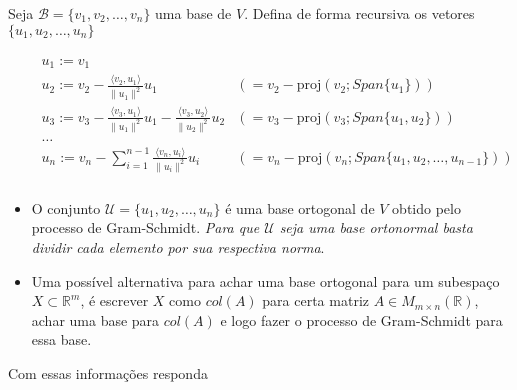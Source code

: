 \documentclass[10pt]{article}
\theoremstyle{plain}
\theoremstyle{obs}
\numberwithin{equation}{section}
\begin{document}
 Seja $\mathcal{B}=\{v_1, v_2, \dots, v_n\}$ uma base de $V$.
 Defina de forma recursiva os vetores $\{u_1, u_2, \dots, u_n\}$ 
 
 \begin{eqnarray*}
  \begin{array}{llll}
  & &u_{1}:=v_1  &\\
  & &u_{2}:=v_{2}-\frac{\langle v_2,u_1\rangle}{\|u_1\|^{2}}u_{1} &(=v_{2}-\text{proj}(v_2;Span\{u_1\}))\\
  & &u_{3}:=v_{3}-\frac{\langle v_3,u_1\rangle}{\|u_1\|^{2}}u_{1}-\frac{\langle v_3,u_2\rangle}{\|u_2\|^{2}}u_{2}
  & (=v_{3}-\text{proj}(v_3;Span\{u_1,u_2\}))\\
  & & \dots \\ 
  & &u_{n}:=v_{n}-\sum_{i=1}^{n-1}\frac{\langle v_n,u_i\rangle}{\|u_i\|^{2}}u_{i}
  & (=v_{n}-\text{proj}(v_n;Span\{u_1,u_2,\dots,u_{n-1}\}))\\
  \end{array}
 \end{eqnarray*}

 \begin{itemize}
  \item 
 O conjunto $\mathcal{U}=\{u_1, u_2, \dots, u_n\}$ é uma base ortogonal de $V$ obtido pelo processo 
 de Gram-Schmidt. {\it Para que  $\mathcal{U}$ 
 seja uma base ortonormal basta dividir cada elemento por sua respectiva norma}.
 \item
 Uma possível alternativa para achar uma base ortogonal para um subespaço $X \subset \mathbb{R}^{m}$, é
 escrever $X$ como $col(A)$ para certa matriz $A \in M_{m \times n}(\mathbb{R})$, achar uma base para $col(A)$ 
 e logo fazer o processo de Gram-Schmidt
 para essa base.
 \end{itemize}
  
 Com essas informações responda
 
\end{document}
